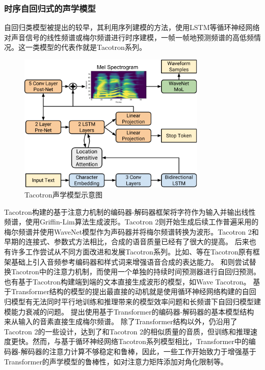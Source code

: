 \subsubsection{时序自回归式的声学模型}
自回归类模型被提出的较早，其利用序列建模的方法，使用LSTM等循环神经网络对声音信号的线性频谱或梅尔频谱进行时序建模，一帧一帧地预测频谱的高低频情况。这一类模型的代表作就是Tacotron系列。
\begin{figure}[ht]
  \includegraphics[width=0.80\textwidth]{figure/related/tacotron2.pdf}
  \caption{Tacotron声学模型示意图}
\end{figure}
Tacotron\citep{tacotron}构建的基于注意力机制的编码器-解码器框架将字符作为输入并输出线性频谱，使用Griffin-Lim算法\citep{GriffinLim}生成波形。Tacotron 2\citep{shen2018natural}则开始生成后续工作普遍采用的梅尔频谱并使用WaveNet\citep{vanwavenet}模型作为声码器并将梅尔频谱转换为波形。Tacotron 2和早期的连接式、参数式方法相比，合成的语音质量已经有了很大的提高。
后来也有许多工作尝试从不同方面改进和发展Tacotron系列。比如\citet{gsttacotron}、\citet{reftacotron}等在Tacotron原有框架基础上引入音频参考编码器和样式词来增强语音合成的表达能力。
\citet{nonattentivetacotron}和\citet{durian}则尝试替换Tacotron中的注意力机制，而使用一个单独的持续时间预测器进行自回归预测。
也有基于Tacotron构建端到端的文本直接生成波形的模型，如Wave Tacotron\citep{wavetacotron}。
基于Transformer结构的模型的提出最直接的动机就是使用循环神经网络构建的自回归模型有无法同时平行地训练和推理带来的模型效率问题和长频谱下自回归模型建模能力衰减的问题。
\citet{transformertts}提出使用基于Transformer的编码器-解码器的基本模型结构来从输入的音素直接生成梅尔频谱。
\citet{transformertts}除了Transformer结构以外，仍沿用了Tacotron 2的一些设计，达到了和Tacotron 2的相似质量的音质，但训练和推理速度更快。然而，与基于循环神经网络Tacotron系列模型相比，Transformer中的编码器-解码器的注意力计算不够稳定和鲁棒，因此，一些工作开始致力于增强基于Transformer的声学模型的鲁棒性，如对注意力矩阵添加对角化限制\citep{robutrans}等。
